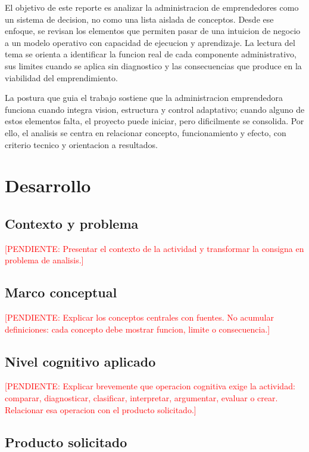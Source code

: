 \documentclass[
	spanish,
	letterpaper, oneside
]{article}
\newcommand{\pendiente}[1]{\textcolor{red}{[PENDIENTE: #1]}}
\begin{document}
El objetivo de este reporte es analizar la administracion de emprendedores como un sistema de decision, no como una lista aislada de conceptos. Desde ese enfoque, se revisan los elementos que permiten pasar de una intuicion de negocio a un modelo operativo con capacidad de ejecucion y aprendizaje. La lectura del tema se orienta a identificar la funcion real de cada componente administrativo, sus limites cuando se aplica sin diagnostico y las consecuencias que produce en la viabilidad del emprendimiento.

La postura que guia el trabajo sostiene que la administracion emprendedora funciona cuando integra vision, estructura y control adaptativo; cuando alguno de estos elementos falta, el proyecto puede iniciar, pero dificilmente se consolida. Por ello, el analisis se centra en relacionar concepto, funcionamiento y efecto, con criterio tecnico y orientacion a resultados.

\section{Desarrollo}

\subsection{Contexto y problema}

\pendiente{Presentar el contexto de la actividad y transformar la consigna en problema de analisis.}

\subsection{Marco conceptual}

\pendiente{Explicar los conceptos centrales con fuentes. No acumular definiciones: cada concepto debe mostrar funcion, limite o consecuencia.}

\subsection{Nivel cognitivo aplicado}

\pendiente{Explicar brevemente que operacion cognitiva exige la actividad: comparar, diagnosticar, clasificar, interpretar, argumentar, evaluar o crear. Relacionar esa operacion con el producto solicitado.}

\subsection{Producto solicitado}
\end{document}
